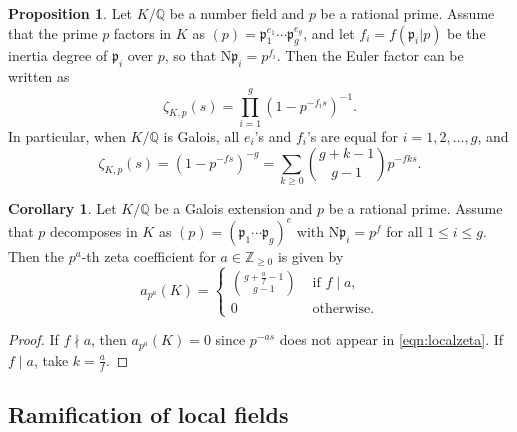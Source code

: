 \documentclass[letterpaper, 10pt]{article}
\newcommand{\rN}{\mathrm{N}}
\newcommand{\bQ}{\mathbb{Q}}
\newcommand{\frp}{\mathfrak{p}}
\newcommand{\1}{\mathds{1}}	%
\theoremstyle{definition}
\newtheorem{proposition}[theorem]{Proposition}
\newtheorem{corollary}[theorem]{Corollary}
\theoremstyle{remark}
\begin{document}
\begin{proposition}
    \label{prop:dedekind_euler}
    Let $K / \bQ$ be a number field and $p$ be a rational prime. Assume that the prime $p$ factors in $K$ as $(p) = \frp_1^{e_1} \cdots \frp_{g}^{e_g}$, and let $f_i = f(\frp_i | p)$ be the inertia degree of $\frp_i$ over $p$, so that $\rN \frp_i = p^{f_i}$.
    Then the Euler factor can be written as
    \begin{equation}
        \zeta_{K, p}(s) = \prod_{i=1}^{g} (1 - p^{-f_i s})^{-1}.
    \end{equation}
    In particular, when $K / \bQ$ is Galois, all $e_i$'s and $f_i$'s are equal for $i=1,2, \dots , g$, and
    \begin{equation}
    \label{eqn:localzeta}
        \zeta_{K, p}(s) = (1 - p^{-fs})^{-g} = \sum_{k \ge 0} \binom{g + k - 1}{g - 1} p^{-fks}.
    \end{equation}
\end{proposition}
\begin{corollary}
    \label{cor:prime_pow_zeta_coeff}
   Let $K / \bQ$ be a Galois extension and $p$ be a rational prime.
   Assume that $p$ decomposes in $K$ as $(p) = (\frp_1 \cdots \frp_g)^{e}$ with $\rN \frp_i =p^f$ for all $1 \le i \le g$.
   Then the $p^a$-th zeta coefficient for $a \in \mathbb Z_{\ge 0}$ is given by
   \begin{equation}
   \label{eqn:dedekindzeta_primepow}
       a_{p^{a}}(K) = \begin{cases} \binom{g + \frac{a}{f} - 1}{g-1} & \text{ if } f \mid a, \\ 0 & \text{ otherwise}.\end{cases}
   \end{equation}
\end{corollary}

\begin{proof}
    If $f \nmid a$, then $a_{p^a}(K) = 0$ since $p^{-as}$ does not appear in \eqref{eqn:localzeta}.
    If $f \mid a$, take $k = \frac{a}{f}$.
\end{proof}



\subsection{Ramification of local fields}
\label{subsec:prelim_tameram}
\end{document}
